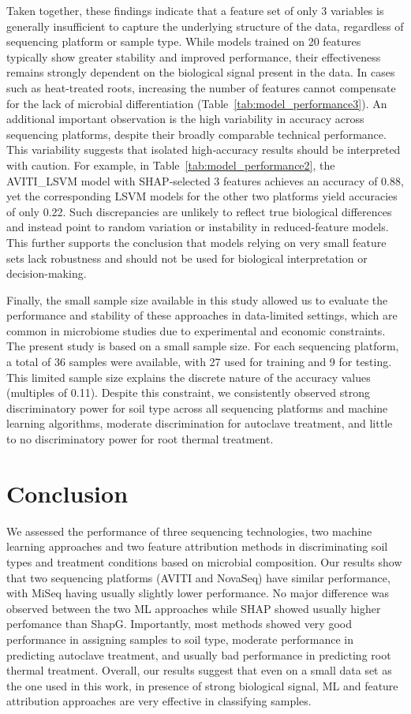 \documentclass[12pt]{article}
\theoremstyle{thmstyleone}%
\theoremstyle{thmstyletwo}%
\theoremstyle{thmstylethree}%
\begin{document}
Taken together, these findings indicate that a feature set of only 3 variables is generally insufficient to capture the underlying structure of the data, regardless of sequencing platform or sample type. While models trained on 20 features typically show greater stability and improved performance, their effectiveness remains strongly dependent on the biological signal present in the data. In cases such as heat-treated roots, increasing the number of features cannot compensate for the lack of microbial differentiation (Table~\ref{tab:model_performance3}). An additional important observation is the high variability in accuracy across sequencing platforms, despite their broadly comparable technical performance. This variability suggests that isolated high‑accuracy results should be interpreted with caution. For example, in Table~\ref{tab:model_performance2}, the AVITI\_LSVM model with SHAP‑selected 3 features achieves an accuracy of 0.88, yet the corresponding LSVM models for the other two platforms yield accuracies of only 0.22. Such discrepancies are unlikely to reflect true biological differences and instead point to random variation or instability in reduced-feature models. This further supports the conclusion that models relying on very small feature sets lack robustness and should not be used for biological interpretation or decision-making.

Finally, the small sample size available in this study allowed us to evaluate the performance and stability of these approaches in data-limited settings, which are common in microbiome studies due to experimental and economic constraints. The present study is based on a small sample size. For each sequencing platform, a total of 36 samples were available, with 27 used for training and 9 for testing. This limited sample size explains the discrete nature of the accuracy values (multiples of 0.11). Despite this constraint, we consistently observed strong discriminatory power for soil type across all sequencing platforms and machine learning algorithms, moderate discrimination for autoclave treatment, and little to no discriminatory power for root thermal treatment. 

\section{Conclusion}
We assessed the performance of three sequencing technologies, two machine learning approaches and two feature attribution methods in discriminating soil types and treatment conditions based on microbial composition. Our results show that two sequencing platforms (AVITI and NovaSeq) have similar performance, with MiSeq having usually slightly lower performance. No major difference was observed between the two ML approaches while SHAP showed usually higher perfomance than ShapG. Importantly, most methods showed very good performance in assigning samples to soil type, moderate performance in predicting autoclave treatment, and usually bad performance in predicting root thermal treatment. Overall, our results suggest that even on a small data set as the one used in this work, in presence of strong biological signal, ML and feature attribution approaches are very effective in classifying samples.
\end{document}
